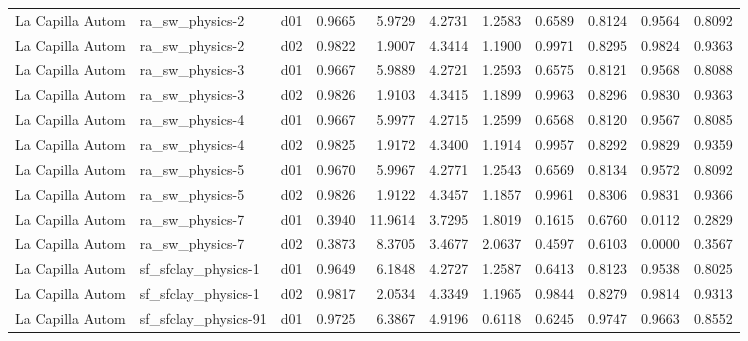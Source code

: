 \begin{longtable}{lllrrrrrrrr}
     La Capilla Autom  &       ra\_sw\_physics-2 &     d01 &   0.9665 &   5.9729 &   4.2731 &       1.2583 &        0.6589 &       0.8124 &           0.9564 &  0.8092 \\
     La Capilla Autom  &       ra\_sw\_physics-2 &     d02 &   0.9822 &   1.9007 &   4.3414 &       1.1900 &        0.9971 &       0.8295 &           0.9824 &  0.9363 \\
     La Capilla Autom  &       ra\_sw\_physics-3 &     d01 &   0.9667 &   5.9889 &   4.2721 &       1.2593 &        0.6575 &       0.8121 &           0.9568 &  0.8088 \\
     La Capilla Autom  &       ra\_sw\_physics-3 &     d02 &   0.9826 &   1.9103 &   4.3415 &       1.1899 &        0.9963 &       0.8296 &           0.9830 &  0.9363 \\
     La Capilla Autom  &       ra\_sw\_physics-4 &     d01 &   0.9667 &   5.9977 &   4.2715 &       1.2599 &        0.6568 &       0.8120 &           0.9567 &  0.8085 \\
     La Capilla Autom  &       ra\_sw\_physics-4 &     d02 &   0.9825 &   1.9172 &   4.3400 &       1.1914 &        0.9957 &       0.8292 &           0.9829 &  0.9359 \\
     La Capilla Autom  &       ra\_sw\_physics-5 &     d01 &   0.9670 &   5.9967 &   4.2771 &       1.2543 &        0.6569 &       0.8134 &           0.9572 &  0.8092 \\
     La Capilla Autom  &       ra\_sw\_physics-5 &     d02 &   0.9826 &   1.9122 &   4.3457 &       1.1857 &        0.9961 &       0.8306 &           0.9831 &  0.9366 \\
     La Capilla Autom  &       ra\_sw\_physics-7 &     d01 &   0.3940 &  11.9614 &   3.7295 &       1.8019 &        0.1615 &       0.6760 &           0.0112 &  0.2829 \\
     La Capilla Autom  &       ra\_sw\_physics-7 &     d02 &   0.3873 &   8.3705 &   3.4677 &       2.0637 &        0.4597 &       0.6103 &           0.0000 &  0.3567 \\
     La Capilla Autom  &   sf\_sfclay\_physics-1 &     d01 &   0.9649 &   6.1848 &   4.2727 &       1.2587 &        0.6413 &       0.8123 &           0.9538 &  0.8025 \\
     La Capilla Autom  &   sf\_sfclay\_physics-1 &     d02 &   0.9817 &   2.0534 &   4.3349 &       1.1965 &        0.9844 &       0.8279 &           0.9814 &  0.9313 \\
     La Capilla Autom  &  sf\_sfclay\_physics-91 &     d01 &   0.9725 &   6.3867 &   4.9196 &       0.6118 &        0.6245 &       0.9747 &           0.9663 &  0.8552 \\

\end{longtable}
